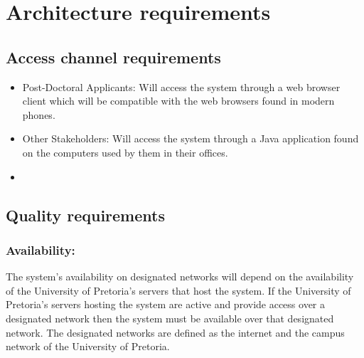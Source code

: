 \documentclass[12pt]{article}
\begin{document}
	\vspace{0.5in}
	
	\newpage
	\section{Architecture requirements}
		\subsection{Access channel requirements} %
		\vspace{0.2in}
		\begin{itemize}
		\item Post-Doctoral Applicants: Will access the system through a web browser client which will be compatible with the web browsers found in modern phones. 
		\item Other Stakeholders: Will access the system through a Java application found on the computers used by them in their offices.
		\item %
		\end{itemize}

		\vspace{0.2in}
		
		\subsection{Quality requirements} %
		\vspace{0.2in}
		
		\subsubsection{Availability:}
				
		\begin{flushleft}
		
		The system's availability on designated networks will depend on the availability of the University of Pretoria's servers that host the system. If the University of Pretoria's servers hosting the system are active and provide access over a designated network then the system must be available over that designated network. The designated networks are defined as the internet and the campus network of the University of Pretoria.
		
		\end{flushleft}
		
		\vspace{0.1in}
				
\end{document}
